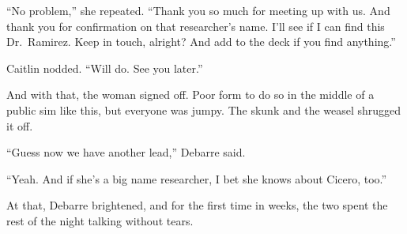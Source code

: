 ``No problem,'' she repeated. ``Thank you so much for meeting up with us. And thank you for confirmation on that researcher's name. I'll see if I can find this Dr.~Ramirez. Keep in touch, alright? And add to the deck if you find anything.''

Caitlin nodded. ``Will do. See you later.''

And with that, the woman signed off. Poor form to do so in the middle of a public sim like this, but everyone was jumpy. The skunk and the weasel shrugged it off.

``Guess now we have another lead,'' Debarre said.

``Yeah. And if she's a big name researcher, I bet she knows about Cicero, too.''

At that, Debarre brightened, and for the first time in weeks, the two spent the rest of the night talking without tears.
